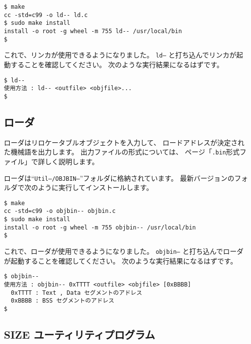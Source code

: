 \begin{mylist}
\begin{verbatim}
$ make
cc -std=c99 -o ld-- ld.c
$ sudo make install
install -o root -g wheel -m 755 ld-- /usr/local/bin
$
\end{verbatim}
\end{mylist}

これで、\tac リンカが使用できるようになりました。
{\tt ld--} と打ち込んでリンカが起動することを確認してください。
次のような実行結果になるはずです。

\begin{mylist}
\begin{verbatim}
$ ld--
使用方法 : ld-- <outfile> <objfile>...
$
\end{verbatim}
\end{mylist}

\subsection{ローダ}

ローダはリロケータブルオブジェクトを入力して、
ロードアドレスが決定された機械語を出力します。
出力ファイルの形式については、
\pageref{app:bformat}ページ「\verb/.bin/形式ファイル」で詳しく説明します。

ローダは``{\tt Util--/OBJBIN--}''フォルダに格納されています。
最新バージョンのフォルダで次のように実行してインストールします。

\begin{mylist}
\begin{verbatim}
$ make
cc -std=c99 -o objbin-- objbin.c
$ sudo make install
install -o root -g wheel -m 755 objbin-- /usr/local/bin
$ 
\end{verbatim}
\end{mylist}

これで、\tac ローダが使用できるようになりました。
{\tt objbin--} と打ち込んでローダが起動することを確認してください。
次のような実行結果になるはずです。

\begin{mylist}
\begin{verbatim}
$ objbin--
使用方法 : objbin-- 0xTTTT <outfile> <objfile> [0xBBBB]
  0xTTTT : Text , Data セグメントのアドレス
  0xBBBB : BSS セグメントのアドレス
$
\end{verbatim}
\end{mylist}

\subsection{SIZE ユーティリティプログラム}


